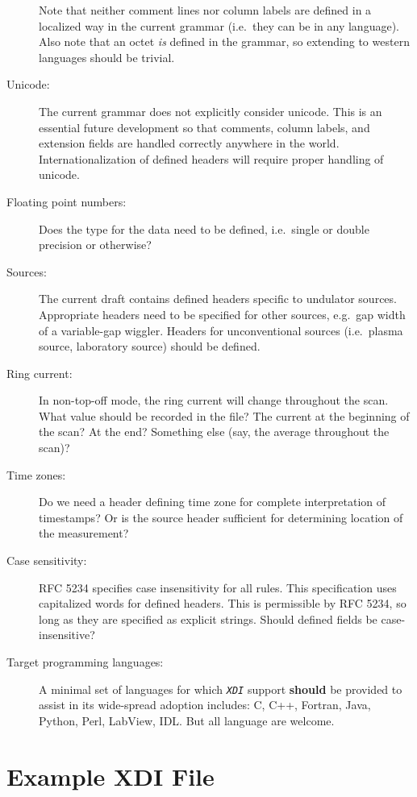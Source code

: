 \documentclass{article}
\newcommand{\sltt}[1]{\texttt{\textsl{#1}}}
\newcommand{\xdi}{\sltt{XDI}}
\begin{document}
\begin{description}
  Note that neither comment lines nor column labels are defined in a
  localized way in the current grammar (i.e.\ they can be in any
  language).  Also note that an octet \textit{is} defined in the
  grammar, so extending to western languages should be trivial.
\item[Unicode:] The current grammar does not explicitly consider
  unicode.  This is an essential future development so that comments,
  column labels, and extension fields are handled correctly anywhere
  in the world.  Internationalization of defined headers will require
  proper handling of unicode.\label{anchor:unicode}
\item[Floating point numbers:] Does the type for the data need to be
  defined, i.e.\ single or double precision or
  otherwise?\label{anchor:floats}
\item[Sources:] The current draft contains defined headers specific to
  undulator sources.  Appropriate headers need to be specified for
  other sources, e.g.\ gap width of a variable-gap wiggler.  Headers
  for unconventional sources (i.e.\ plasma source, laboratory source)
  should be defined.\label{anchor:sources}
\item[Ring current:] In non-top-off mode, the ring current will change
  throughout the scan.  What value should be recorded in the file?
  The current at the beginning of the scan?  At the end?  Something
  else (say, the average throughout the scan)?\label{anchor:current}
\item[Time zones:] Do we need a header defining time zone for complete
  interpretation of timestamps? Or is the source header sufficient for
  determining location of the measurement?\label{anchor:timezones}
\item[Case sensitivity:] RFC 5234 specifies case insensitivity for all
  rules.  This specification uses capitalized words for defined
  headers.  This is permissible by RFC 5234, so long as they are
  specified as explicit strings.  Should defined fields be
  case-insensitive?
\item[Target programming languages:] A minimal set of languages for
  which {\xdi} support \textbf{should} be provided to assist in its
  wide-spread adoption includes: C, C++, Fortran, Java, Python, Perl,
  LabView, IDL.  But all language are welcome.
\end{description}

\newpage
\appendix

\section{Example XDI File}
\label{apdx:example}
\end{document}
